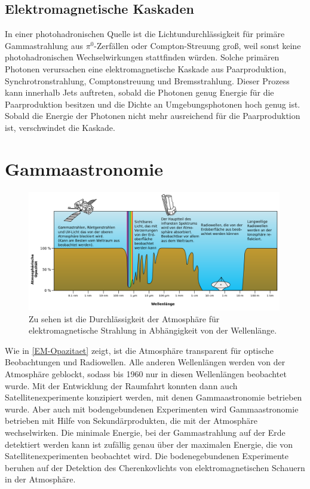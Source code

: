 \subsection{Elektromagnetische Kaskaden}
In einer photohadronischen Quelle ist die Lichtundurchlässigkeit für primäre Gammastrahlung aus $\pi^0$-Zerfällen oder Compton-Streuung groß, weil sonst keine photohadronischen Wechselwirkungen stattfinden würden.
Solche primären Photonen verursachen eine elektromagnetische Kaskade aus Paarproduktion, Synchrotronstrahlung, Comptonstreuung und Bremsstrahlung.
Dieser Prozess kann innerhalb Jets auftreten, sobald die Photonen genug Energie für die Paarproduktion besitzen und die Dichte an Umgebungsphotonen hoch genug ist.
Sobald die Energie der Photonen nicht mehr ausreichend für die Paarproduktion ist, verschwindet die Kaskade.\cite{RelativisticJets}


\section{Gammaastronomie}
\label{sec:Gammaastronomie}


\begin{figure}
    \centering
    \includegraphics[width=0.99\textwidth]{./Plots/02_Astroteilchenphysik/Atmospheric_electromagnetic_opacity.png}
    \caption{Zu sehen ist die Durchlässigkeit der Atmosphäre für elektromagnetische Strahlung in Abhängigkeit von der Wellenlänge.\cite{Opazitaet}}
    \label{EM-Opazitaet}
\end{figure}


Wie in \autoref{EM-Opazitaet} zeigt, ist die Atmosphäre transparent für optische Beobachtungen und Radiowellen. 
Alle anderen Wellenlängen werden von der Atmosphäre geblockt, sodass bis 1960 nur in diesen Wellenlängen beobachtet wurde.
Mit der Entwicklung der Raumfahrt konnten dann auch Satellitenexperimente konzipiert werden, mit denen Gammaastronomie betrieben wurde.
Aber auch mit bodengebundenen Experimenten wird Gammaastronomie betrieben mit Hilfe von Sekundärprodukten, die mit der Atmosphäre wechselwirken.
Die minimale Energie, bei der Gammastrahlung auf der Erde detektiert werden kann ist zufällig genau über der maximalen Energie, die von Satellitenexperimenten beobachtet wird.
Die bodenegebundenen Experimente beruhen auf der Detektion des Cherenkovlichts von elektromagnetischen Schauern in der Atmosphäre.\cite{Weekes}

